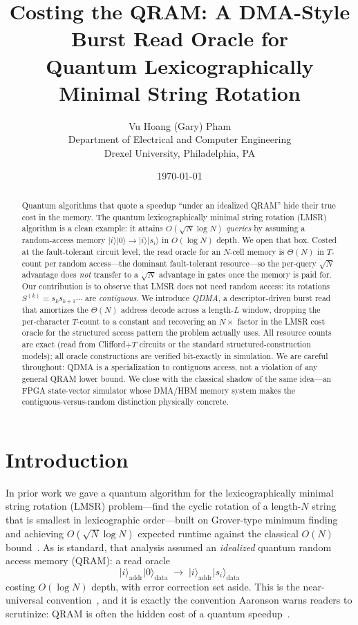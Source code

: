 \documentclass[11pt]{article}
\title{\textbf{Costing the QRAM: A DMA-Style Burst Read Oracle for\\
Quantum Lexicographically Minimal String Rotation}}
\author{Vu Hoang (Gary) Pham\\[2pt]
\normalsize Department of Electrical and Computer Engineering\\
\normalsize Drexel University, Philadelphia, PA}
\date{\today}
\theoremstyle{definition}
\begin{document}
\maketitle

\begin{abstract}
Quantum algorithms that quote a speedup ``under an idealized QRAM'' hide their
true cost in the memory. The quantum lexicographically minimal string rotation
(LMSR) algorithm is a clean example: it attains $O(\sqrt{N}\log N)$ \emph{queries}
by assuming a random-access memory $\lvert i\rangle\lvert 0\rangle \to
\lvert i\rangle\lvert s_i\rangle$ in $O(\log N)$ depth. We open that box. Costed
at the fault-tolerant circuit level, the read oracle for an $N$-cell memory is
$\Theta(N)$ in $T$-count per random access---the dominant fault-tolerant
resource---so the per-query $\sqrt{N}$ advantage does \emph{not} transfer to a
$\sqrt{N}$ advantage in gates once the memory is paid for. Our contribution is to
observe that LMSR does not need random access: its rotations
$S^{(k)}=s_k s_{k+1}\cdots$ are \emph{contiguous}. We introduce \emph{QDMA}, a
descriptor-driven burst read that amortizes the $\Theta(N)$ address decode across
a length-$L$ window, dropping the per-character $T$-count to a constant and
recovering an $N\times$ factor in the LMSR cost oracle for the structured access
pattern the problem actually uses. All resource counts are exact (read from
Clifford+$T$ circuits or the standard structured-construction models); all oracle
constructions are verified bit-exactly in simulation. We are careful throughout:
QDMA is a specialization to contiguous access, not a violation of any general QRAM
lower bound. We close with the classical shadow of the same idea---an
FPGA state-vector simulator whose DMA/HBM memory system makes the
contiguous-versus-random distinction physically concrete.
\end{abstract}

\section{Introduction}
\label{sec:intro}
In prior work we gave a quantum algorithm for the lexicographically minimal string
rotation (LMSR) problem---find the cyclic rotation of a length-$N$ string that is
smallest in lexicographic order---built on Grover-type minimum
finding~\cite{grover1996fast,durr1996minimum} and achieving
$O(\sqrt{N}\log N)$ expected runtime against the classical $O(N)$
bound~\cite{pham2025lmsr}. As is standard, that analysis assumed an
\emph{idealized} quantum random access memory (QRAM): a read oracle
\begin{equation}
  \lvert i\rangle_{\text{addr}}\lvert 0\rangle_{\text{data}}
  \;\longrightarrow\;
  \lvert i\rangle_{\text{addr}}\lvert s_i\rangle_{\text{data}}
  \label{eq:readoracle}
\end{equation}
costing $O(\log N)$ depth, with error correction set aside. This is the
near-universal convention~\cite{giovannetti2008qram,giovannetti2008architectures},
and it is exactly the convention Aaronson warns readers to scrutinize: QRAM is
often the hidden cost of a quantum speedup~\cite{aaronson2015fineprint}.
\end{document}
